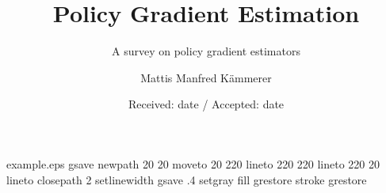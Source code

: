 \begin{filecontents*}{example.eps}
gsave
newpath
  20 20 moveto
  20 220 lineto
  220 220 lineto
  220 20 lineto
closepath
2 setlinewidth
gsave
  .4 setgray fill
grestore
stroke
grestore
\end{filecontents*}
\RequirePackage{fix-cm}
\documentclass[draft]{svjour3}
\smartqed
\usepackage[T1]{fontenc}
\usepackage[utf8]{inputenc}
\usepackage[final]{graphicx}
\graphicspath{ {./images/} }
\usepackage{amsmath,amssymb}
\usepackage[final]{hyperref}
\usepackage{tikz}
\usepackage{environ}
\usetikzlibrary{shapes,arrows,positioning,calc}


\title{Policy Gradient Estimation}
\subtitle{A survey on policy gradient estimators}

\author {Mattis Manfred K{\"a}mmerer}


\date{Received: date / Accepted: date}

\maketitle

\begin{abstract}

The goal of policy gradient approaches is to find a policy in a given class of policies which maximizes the expected return.
Given a differentiable model of the policy, we want to apply a gradient-ascent technique to reach the local optimum. 
Gradient ascent has strong guarantees on convergence, and is theoretically well researched.
The main issue is that the policy gradient with respect to the expected return is not available, thus we need to estimate it.
For this reason, the biggest weakness of policy gradient algorithms is sample efficiency, as they tend to require on-policy data for the gradient estimate, and conservative learning rates for the convergence guarantees.
Thus, most research is focused on finding algorithms with improved sample efficiency.
This paper provides a deep introduction to policy gradient that shows the development of policy gradient approaches, and should enable the reader to understand current research in the area. 

\end{abstract}

